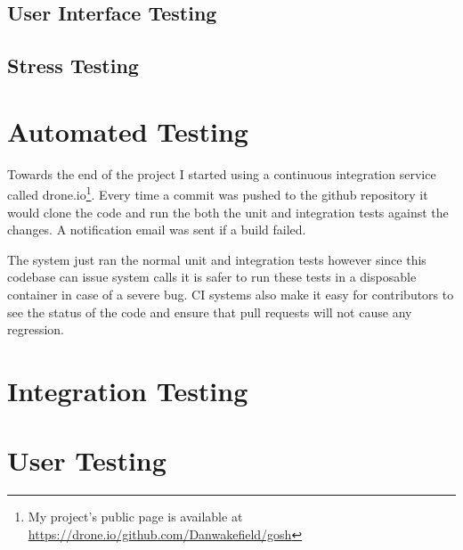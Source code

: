 \subsection{User Interface Testing}

\subsection{Stress Testing}

\section{Automated Testing}
Towards the end of the project I started using a continuous integration service called drone.io\footnote{My project's public page is available at \url{https://drone.io/github.com/Danwakefield/gosh}}.
Every time a commit was pushed to the github repository it would clone the code and run the both the unit and integration tests against the changes.
A notification email was sent if a build failed.

The system just ran the normal unit and integration tests however since this codebase can issue system calls it is safer to run these tests in a disposable container in case of a severe bug.  
CI systems also make it easy for contributors to see the status of the code and ensure that pull requests will not cause any regression.

\section{Integration Testing}

\section{User Testing}